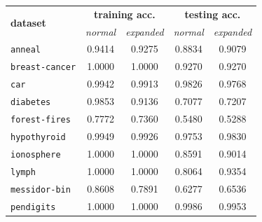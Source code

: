 \documentclass[12pt]{report}
\theoremstyle{definition}
\theoremstyle{definition}
\theoremstyle{definition}
\begin{document}
\begin{table}[ht]
    \centering
    \begin{tabular}{lcccc}
    \hline
    \multicolumn{1}{l}{\multirow{2}{*}{\bf dataset}} & \multicolumn{2}{c}{\bf training acc.} & \multicolumn{2}{c}{\bf testing acc.} \\
    \multicolumn{1}{l}{} & \multicolumn{1}{p{2cm}}{\centering \it normal} & \multicolumn{1}{p{2cm}}{\centering \it expanded} & \multicolumn{1}{p{2cm}}{\centering \it normal} & \multicolumn{1}{p{2cm}}{\centering \it expanded} \\
    \hline
    \multicolumn{1}{l}{\tt anneal}        & \multicolumn{1}{c}{0.9414} & \multicolumn{1}{c}{0.9275} & \multicolumn{1}{c}{0.8834} & \multicolumn{1}{c}{0.9079} \\
    \multicolumn{1}{l}{\tt breast-cancer} & \multicolumn{1}{c}{1.0000} & \multicolumn{1}{c}{1.0000} & \multicolumn{1}{c}{0.9270} & \multicolumn{1}{c}{0.9270} \\
    \multicolumn{1}{l}{\tt car}           & \multicolumn{1}{c}{0.9942} & \multicolumn{1}{c}{0.9913} & \multicolumn{1}{c}{0.9826} & \multicolumn{1}{c}{0.9768} \\
    \multicolumn{1}{l}{\tt diabetes}      & \multicolumn{1}{c}{0.9853} & \multicolumn{1}{c}{0.9136} & \multicolumn{1}{c}{0.7077} & \multicolumn{1}{c}{0.7207} \\
    \multicolumn{1}{l}{\tt forest-fires}  & \multicolumn{1}{c}{0.7772} & \multicolumn{1}{c}{0.7360} & \multicolumn{1}{c}{0.5480} & \multicolumn{1}{c}{0.5288} \\
    \multicolumn{1}{l}{\tt hypothyroid}   & \multicolumn{1}{c}{0.9949} & \multicolumn{1}{c}{0.9926} & \multicolumn{1}{c}{0.9753} & \multicolumn{1}{c}{0.9830} \\
    \multicolumn{1}{l}{\tt ionosphere}    & \multicolumn{1}{c}{1.0000} & \multicolumn{1}{c}{1.0000} & \multicolumn{1}{c}{0.8591} & \multicolumn{1}{c}{0.9014} \\
    \multicolumn{1}{l}{\tt lymph}         & \multicolumn{1}{c}{1.0000} & \multicolumn{1}{c}{1.0000} & \multicolumn{1}{c}{0.8064} & \multicolumn{1}{c}{0.9354} \\
    \multicolumn{1}{l}{\tt messidor-bin}  & \multicolumn{1}{c}{0.8608} & \multicolumn{1}{c}{0.7891} & \multicolumn{1}{c}{0.6277} & \multicolumn{1}{c}{0.6536} \\
    \multicolumn{1}{l}{\tt pendigits}     & \multicolumn{1}{c}{1.0000} & \multicolumn{1}{c}{1.0000} & \multicolumn{1}{c}{0.9986} & \multicolumn{1}{c}{0.9953} \\

\end{tabular}
\end{table}
\end{document}
